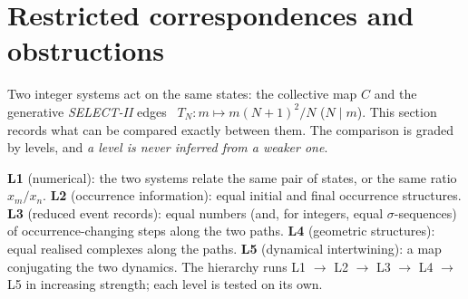 \section{Restricted correspondences and obstructions}\label{sec:corr}
Two integer systems act on the same states: the collective map $C$ and the generative \emph{SELECT-II} edges~\cite{FoundI} $T_N:m\mapsto m(N+1)^2/N$ ($N\mid m$). This section records what can be compared exactly between them. The comparison is graded by levels, and \emph{a level is never inferred from a weaker one}.

\begin{definition}\label{def:levels}
\textbf{L1} (numerical): the two systems relate the same pair of states, or the same ratio $x_m/x_n$. \textbf{L2} (occurrence information): equal initial and final occurrence structures. \textbf{L3} (reduced event records): equal numbers (and, for integers, equal $\sigma$-sequences) of occurrence-changing steps along the two paths. \textbf{L4} (geometric structures): equal realised complexes along the paths. \textbf{L5} (dynamical intertwining): a map conjugating the two dynamics. The hierarchy runs L1 $\to$ L2 $\to$ L3 $\to$ L4 $\to$ L5 in increasing strength; each level is tested on its own.
\end{definition}

